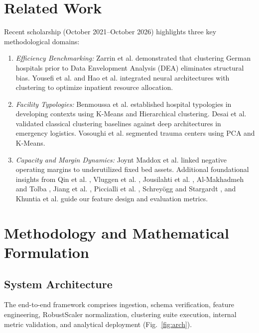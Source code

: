 \documentclass[conference]{IEEEtran}
\begin{document}
\section{Related Work}
Recent scholarship (October 2021--October 2026) highlights three key methodological domains:
\begin{enumerate}
    \item \textit{Efficiency Benchmarking:} Zarrin et al. \cite{zarrin2022homogeneity} demonstrated that clustering German hospitals prior to Data Envelopment Analysis (DEA) eliminates structural bias. Yousefi et al. \cite{yousefi2024innovative} and Hao et al. \cite{hao2023assessing} integrated neural architectures with clustering to optimize inpatient resource allocation.
    \item \textit{Facility Typologies:} Benmoussa et al. \cite{benmoussa2024private} established hospital typologies in developing contexts using K-Means and Hierarchical clustering. Desai et al. \cite{desai2023optimal} validated classical clustering baselines against deep architectures in emergency logistics. Vosoughi et al. \cite{vosoughi2024unsupervised} segmented trauma centers using PCA and K-Means.
    \item \textit{Capacity and Margin Dynamics:} Joynt Maddox et al. \cite{joynt2022association} linked negative operating margins to underutilized fixed bed assets. Additional foundational insights from Qin et al. \cite{qin2025measurement}, Vluggen et al. \cite{vluggen2023clusters}, Jousilahti et al. \cite{jousilahti2023patient}, Al-Makhadmeh and Tolba \cite{almakhadmeh2023using}, Jiang et al. \cite{jiang2024latent}, Piccialli et al. \cite{piccialli2021machine}, Schrey{\"o}gg and Stargardt \cite{schreyogg2023hospital}, and Khuntia et al. \cite{khuntia2022digital} guide our feature design and evaluation metrics.
\end{enumerate}

\section{Methodology and Mathematical Formulation}
\subsection{System Architecture}
The end-to-end framework comprises ingestion, schema verification, feature engineering, RobustScaler normalization, clustering suite execution, internal metric validation, and analytical deployment (Fig.~\ref{fig:arch}).
\end{document}
